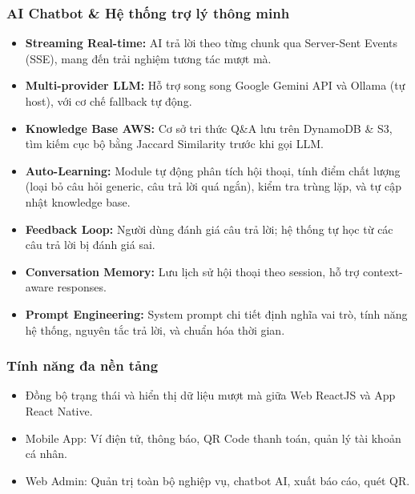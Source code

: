 \documentclass[12pt,a4paper]{article}
\begin{document}
\subsubsection{AI Chatbot \& Hệ thống trợ lý thông minh}
\begin{itemize}
    \item \textbf{Streaming Real-time:} AI trả lời theo từng chunk qua Server-Sent Events (SSE), mang đến trải nghiệm tương tác mượt mà.
    \item \textbf{Multi-provider LLM:} Hỗ trợ song song Google Gemini API và Ollama (tự host), với cơ chế fallback tự động.
    \item \textbf{Knowledge Base AWS:} Cơ sở tri thức Q\&A lưu trên DynamoDB \& S3, tìm kiếm cục bộ bằng Jaccard Similarity trước khi gọi LLM.
    \item \textbf{Auto-Learning:} Module tự động phân tích hội thoại, tính điểm chất lượng (loại bỏ câu hỏi generic, câu trả lời quá ngắn), kiểm tra trùng lặp, và tự cập nhật knowledge base.
    \item \textbf{Feedback Loop:} Người dùng đánh giá câu trả lời; hệ thống tự học từ các câu trả lời bị đánh giá sai.
    \item \textbf{Conversation Memory:} Lưu lịch sử hội thoại theo session, hỗ trợ context-aware responses.
    \item \textbf{Prompt Engineering:} System prompt chi tiết định nghĩa vai trò, tính năng hệ thống, nguyên tắc trả lời, và chuẩn hóa thời gian.
\end{itemize}

\subsubsection{Tính năng đa nền tảng}
\begin{itemize}
    \item Đồng bộ trạng thái và hiển thị dữ liệu mượt mà giữa Web ReactJS và App React Native.
    \item Mobile App: Ví điện tử, thông báo, QR Code thanh toán, quản lý tài khoản cá nhân.
    \item Web Admin: Quản trị toàn bộ nghiệp vụ, chatbot AI, xuất báo cáo, quét QR.
\end{itemize}

\end{document}
